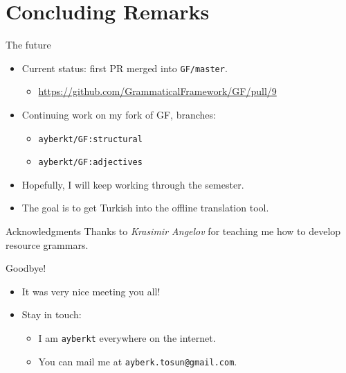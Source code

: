 \documentclass{beamer}
\begin{document}
  \section{Concluding Remarks}

  \begin{frame}{The future}
    \begin{itemize}
      \item<1-> Current status: first PR merged into \texttt{GF/master}.
        \begin{itemize}
          \item<2-> {\scriptsize
            \url{https://github.com/GrammaticalFramework/GF/pull/9}}
        \end{itemize}
      \item<3-> Continuing work on my fork of GF, branches:
        \begin{itemize}
          \item<3-> \texttt{ayberkt/GF:structural}
          \item<3-> \texttt{ayberkt/GF:adjectives}
        \end{itemize}
      \item<4-> Hopefully, I will keep working through the semester.
      \item<5-> The goal is to get Turkish into the offline translation tool.
    \end{itemize}
  \end{frame}

  \begin{frame}{Acknowledgments}
    \Large
      Thanks to \emph{Krasimir Angelov} for teaching me how to develop
      resource grammars.
  \end{frame}

  \begin{frame}{Goodbye!}
    \begin{itemize}
    \item<1-> \alert{It was very nice meeting you all!}
    \item<2-> Stay in touch:
      \begin{itemize}
        \item<3-> I am \alert{\texttt{ayberkt}} everywhere on the internet.
        \item<4-> You can mail me at \texttt{ayberk.tosun@gmail.com}.
      \end{itemize}
    \end{itemize}
  \end{frame}

  
  
\end{document}
